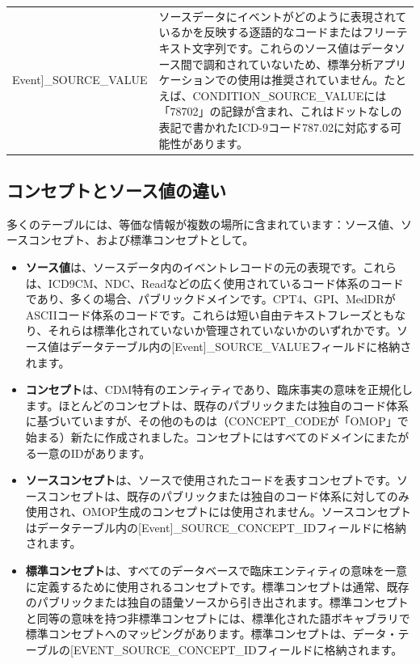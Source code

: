 \documentclass[
  11pt]{book}
\providecommand{\tightlist}{%
  \setlength{\itemsep}{0pt}\setlength{\parskip}{0pt}}
\theoremstyle{definition}
\theoremstyle{definition}
\theoremstyle{definition}
\theoremstyle{definition}
\theoremstyle{remark}
\begin{document}
\begin{longtable}[]{@{}
  >{\raggedright\arraybackslash}p{}
  >{\raggedright\arraybackslash}p{}@{}}
{[}Event{]}\_SOURCE\_VALUE & ソースデータにイベントがどのように表現されているかを反映する逐語的なコードまたはフリーテキスト文字列です。これらのソース値はデータソース間で調和されていないため、標準分析アプリケーションでの使用は推奨されていません。たとえば、CONDITION\_SOURCE\_VALUEには「78702」の記録が含まれ、これはドットなしの表記で書かれたICD-9コード787.02に対応する可能性があります。 \\
\end{longtable}

\subsection{コンセプトとソース値の違い}\label{concepts-Sources}

多くのテーブルには、等価な情報が複数の場所に含まれています：ソース値、ソースコンセプト、および標準コンセプトとして。

\begin{itemize}
\tightlist
\item
  \textbf{ソース値}は、ソースデータ内のイベントレコードの元の表現です。これらは、ICD9CM、NDC、Readなどの広く使用されているコード体系のコードであり、多くの場合、パブリックドメインです。CPT4、GPI、MedDRがASCIIコード体系のコードです。これらは短い自由テキストフレーズともなり、それらは標準化されていないか管理されていないかのいずれかです。ソース値はデータテーブル内の{[}Event{]}\_SOURCE\_VALUEフィールドに格納されます。
\item
  \textbf{コンセプト}は、CDM特有のエンティティであり、臨床事実の意味を正規化します。ほとんどのコンセプトは、既存のパブリックまたは独自のコード体系に基づいていますが、その他のものは（CONCEPT\_CODEが「OMOP」で始まる）新たに作成されました。コンセプトにはすべてのドメインにまたがる一意のIDがあります。
\item
  \textbf{ソースコンセプト}は、ソースで使用されたコードを表すコンセプトです。ソースコンセプトは、既存のパブリックまたは独自のコード体系に対してのみ使用され、OMOP生成のコンセプトには使用されません。ソースコンセプトはデータテーブル内の{[}Event{]}\_SOURCE\_CONCEPT\_IDフィールドに格納されます。
\item
  \textbf{標準コンセプト}は、すべてのデータベースで臨床エンティティの意味を一意に定義するために使用されるコンセプトです。標準コンセプトは通常、既存のパブリックまたは独自の語彙ソースから引き出されます。標準コンセプトと同等の意味を持つ非標準コンセプトには、標準化された語ボキャブラリで標準コンセプトへのマッピングがあります。標準コンセプトは、データ・テーブルの{[}EVENT\_SOURCE\_CONCEPT\_IDフィールドに格納されます。
\end{itemize}
\end{document}

